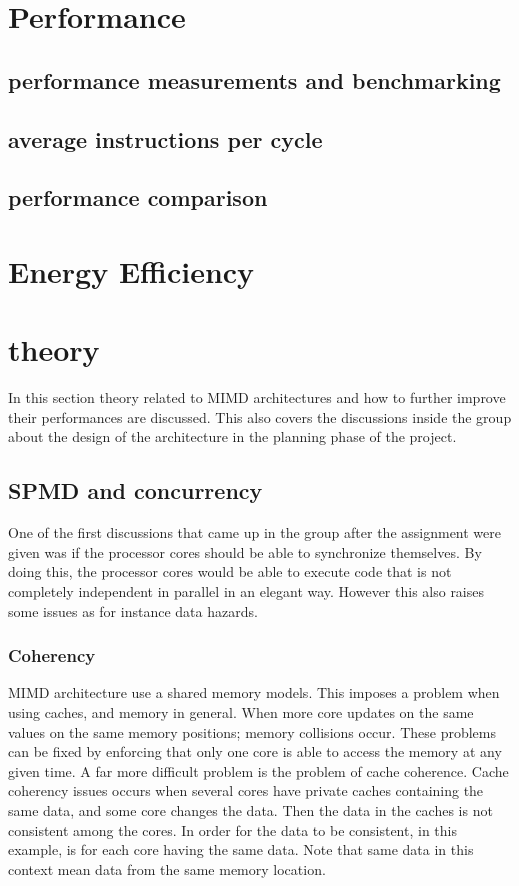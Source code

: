 \section{Performance}
\subsection{performance measurements and benchmarking}
\subsection{average instructions per cycle}
\subsection{performance comparison}


\section{Energy Efficiency}

\section{theory}
In this section theory related to MIMD architectures and how to further improve their performances are discussed.
This also covers the discussions inside the group about the design of the architecture in the planning phase of the project.
\subsection{SPMD and concurrency}
One of the first discussions that came up in the group after the assignment were given was if the processor cores should
be able to synchronize themselves. By doing this, the processor cores would be able to execute code that is not completely independent in parallel in an elegant way.
However this also raises some issues as for instance data hazards.

\subsubsection{Coherency}
MIMD architecture use a shared memory models. This imposes a problem when using caches, and memory in general. When more core updates on the same values on the same memory positions; memory collisions occur. These problems can be fixed by enforcing that only one core is able to access the memory at any given time. A far more difficult problem is the problem of cache coherence. Cache coherency issues occurs when several cores have private caches containing the same data, and some core changes the data. Then the data in the caches is not consistent among the cores. In order for the data to be consistent, in this example, is for each core having the same data. Note that same data in this context mean data from the same memory location. 

